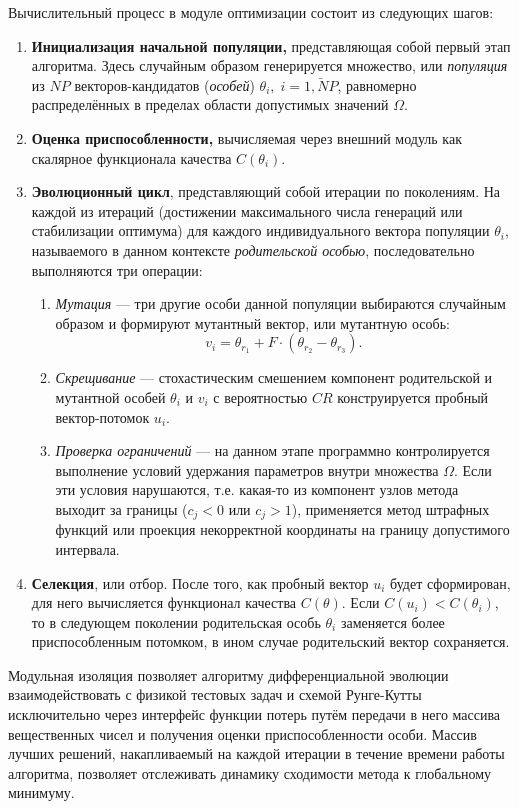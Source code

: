 Вычислительный процесс в модуле оптимизации состоит из следующих шагов:
\begin{enumerate}
	\item \textbf{Инициализация начальной популяции,} представляющая собой первый этап алгоритма. Здесь случайным образом генерируется множество, или \textit{популяция} из $NP$ векторов-кандидатов (\textit{особей}) $\theta_i, \; i = \bar{1, NP}$, равномерно распределённых в пределах области допустимых значений $\Omega$. 
	\item \textbf{Оценка приспособленности,} вычисляемая через внешний модуль как скалярное функционала качества $C(\theta_i)$.
	\item \textbf{Эволюционный цикл}, представляющий собой итерации по поколениям. На каждой из итераций (достижении максимального числа генераций или стабилизации оптимума) для каждого индивидуального вектора популяции $\theta_i$, называемого в данном контексте \textit{родительской особью}, последовательно выполняются три операции:
	\begin{enumerate}
		\item \textit{Мутация} — три другие особи данной популяции выбираются случайным образом и формируют мутантный вектор, или мутантную особь:
		\begin{equation*}
			v_i = \theta_{r_1} + F \cdot (\theta_{r_2} - \theta_{r_3}).
		\end{equation*}
		\item \textit{Скрещивание} — стохастическим смешением компонент родительской и мутантной особей $\theta_i$ и $v_i$ с вероятностью $CR$ конструируется пробный вектор-потомок $u_i$.
		\item \textit{Проверка ограничений} — на данном этапе программно контролируется выполнение условий удержания параметров внутри множества $\Omega$. Если эти условия нарушаются, т.е. какая-то из компонент узлов метода выходит за границы ($c_j < 0$ или $c_j > 1$), применяется метод штрафных функций или проекция некорректной координаты на границу допустимого интервала.
	\end{enumerate}
	\item \textbf{Селекция}, или отбор. После того, как пробный вектор $u_i$ будет сформирован, для него вычисляется функционал качества $C(\theta)$. Если $C(u_i) < C(\theta_i)$, то в следующем поколении родительская особь $\theta_i$ заменяется более приспособленным потомком, в ином случае родительский вектор сохраняется. 
\end{enumerate}

Модульная изоляция позволяет алгоритму дифференциальной эволюции взаимодействовать с физикой тестовых задач и схемой Рунге-Кутты исключительно через интерфейс функции потерь путём передачи в него массива вещественных чисел и получения оценки приспособленности особи. Массив лучших решений, накапливаемый на каждой итерации в течение времени работы алгоритма, позволяет отслеживать динамику сходимости метода к глобальному минимуму.


